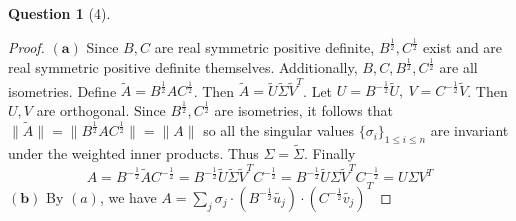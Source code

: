 \documentclass[11pt]{article}
\theoremstyle{quest}
\newtheorem*{question}{Question}
\begin{document}
\begin{question}[4]
\end{question}
\begin{proof}
$\mathbf{(a)}$ Since $B, C$ are real symmetric positive definite, $B^{\frac{1}{2}}, C^{\frac{1}{2}}$ exist and are real symmetric positive definite themselves. Additionally, $B, C, B^{\frac{1}{2}}, C^{\frac{1}{2}}$ are all isometries. Define $\tilde{A} = B^{\frac{1}{2}} A C^{\frac{1}{2}}$. Then $\tilde{A} = \tilde{U}  \tilde{\Sigma} \tilde{V}^T$. Let $U = B^{-\frac{1}{2}} \tilde{U},\ V = C^{-\frac{1}{2}} \tilde{V}$. Then $U, V$ are orthogonal. Since $B^{\frac{1}{2}}, C^{\frac{1}{2}}$ are isometries, it follows that $\|\tilde{A}\| = \|B^{\frac{1}{2}} A C^{\frac{1}{2}}\| = \|A\|$ so all the singular values $\{\sigma_i\}_{1 \le i \le n}$ are invariant under the weighted inner products. Thus $\Sigma = \tilde{\Sigma}$. Finally
$$A = B^{-\frac{1}{2}} \tilde{A} C^{-\frac{1}{2}} = B^{-\frac{1}{2}} \tilde{U}  \tilde{\Sigma} \tilde{V}^T C^{-\frac{1}{2}} = B^{-\frac{1}{2}} \tilde{U}  \Sigma \tilde{V}^T C^{-\frac{1}{2}} = U \Sigma V^T$$
$\mathbf{(b)}$ By $(a)$, we have $A = \sum_j \sigma_j \cdot (B^{-\frac{1}{2}} \tilde{u_j}) \cdot (C^{-\frac{1}{2}} \tilde{v_j})^T$
\end{proof}
\end{document}
